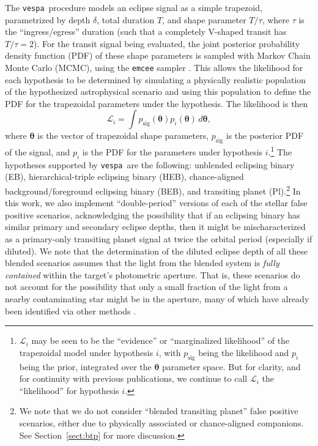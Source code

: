 \documentclass{emulateapj}
\newcommand{\eqlabel}[1]{\label{eq:#1}}
\newcommand{\sectionname}{Section}
\newcommand{\Sect}[1]{\sectionname~\ref{sect:#1}}
\newcommand{\sect}[1]{\Sect{#1}}
\newcommand{\vespa}{\texttt{vespa}}
\newcommand{\bvec}[1]{{\ensuremath{\boldsymbol{#1}}}}
\begin{document}
The \vespa\ procedure models an eclipse signal as a simple trapezoid,
parametrized by depth $\delta$, total duration $T$, and shape
parameter $T / \tau$, where $\tau$ is the ``ingress/egress'' duration
(such that a completely V-shaped transit has $T/\tau = 2$).  For the
transit signal being evaluated, the joint posterior probability
density function (PDF) of these shape parameters is sampled with
Markov Chain Monte Carlo (MCMC), using the \texttt{emcee} sampler
\citep{emcee}.  This allows the likelihood for each hypothesis to be
determined by simulating a physically realistic population of the
hypothesized astrophysical scenario and using this population to
define the PDF for the trapezoidal parameters under the hypothesis.
The likelihood is then \begin{equation}   \eqlabel{lhood}   \mathcal
L_i = \displaystyle \int p_\mathrm{sig}\left(\bvec{\theta}\right)
p_i\left(\bvec{\theta}\right)\,d\bvec{\theta}, \end{equation} where
$\bvec{\theta}$ is the vector of trapezoidal shape parameters,
$p_\mathrm{sig}$ is the posterior PDF of the signal, and $p_i$ is the
PDF for the parameters under hypothesis $i$.\footnote{$\mathcal L_i$
may be seen to be the ``evidence'' or ``marginalized likelihood'' of
the trapezoidal model under hypothesis $i$, with $p_\mathrm{sig}$
being the likelihood and $p_i$ being the prior, integrated over the
$\bvec{\theta}$ parameter space.  But for clarity, and for continuity
with previous publications, we continue to call $\mathcal L_i$ the
``likelihood'' for hypothesis $i$.}  The hypotheses supported by
\vespa\ are the following: unblended eclipsing binary (EB),
hierarchical-triple eclipsing binary (HEB), chance-aligned
background/foreground eclipsing binary (BEB), and transiting planet
(Pl).\footnote{We note that we do not consider ``blended transiting planet''
false positive scenarios, either due to physically associated or 
chance-aligned companions.  See \sect{btp} for more discussion.} 
In this work, we also implement ``double-period'' versions of
each of the stellar false positive scenarios, acknowledging the
possibility that if an eclipsing binary has similar primary and
secondary eclipse depths, then it might be mischaracterized as a
primary-only transiting planet signal at twice the orbital period
(especially if diluted).  We note that the determination of the
diluted eclipse depth of all these blended scenarios assumes that the
light from the blended system is \emph{fully contained} within the
target's photometric aperture.  That is, these scenarios do not
account for the possibility that only a small fraction of the light
from a nearby contaminating star might be in the aperture, many of
which have already been identified via other methods
\cite{Bryson:2013,Coughlin:2014}.
\end{document}
